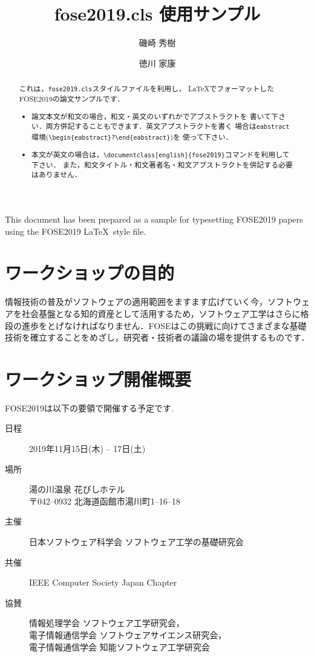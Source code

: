 \documentclass{fose2019}           %
\title{fose2019.cls 使用サンプル}
\author{磯崎 秀樹}{Hideki Isozaki, NTT基礎研究所}
\author{徳川 家康}{Ieyasu Tokugawa, 江戸幕府}
\begin{document}
\maketitle


\begin{abstract}
これは，{\tt fose2019.cls}スタイルファイルを利用し，
\LaTeX でフォーマットしたFOSE2019の論文サンプルです．
\begin{itemize}
\item 論文本文が和文の場合，和文・英文のいずれかでアブストラクトを
書いて下さい．両方併記することもできます．英文アブストラクトを書く
場合は{\tt eabstract}環境(\verb|\begin{eabstract}?\end{eabstract}|)を
使って下さい．
\item 本文が英文の場合は，{\verb|\documentclass[english]{fose2019}|}コマンドを利用して下さい．
また，和文タイトル・和文著者名・和文アブストラクトを併記する必要はありません．
\end{itemize}
\end{abstract}
\begin{eabstract}
This document has been prepared as a sample for typesetting
FOSE2019 papers using the FOSE2019 \LaTeX \ style file.
\end{eabstract}

\section{ワークショップの目的}
情報技術の普及がソフトウェアの適用範囲をますます広げていく今，ソフトウェアを社会基盤となる知的資産として活用するため，ソフトウェア工学はさらに格段の進歩をとげなければなりません．FOSEはこの挑戦に向けてさまざまな基礎技術を確立することをめざし，研究者・技術者の議論の場を提供するものです．

\section{ワークショップ開催概要}
FOSE2019\cite{fose2019}は以下の要領で開催する予定です.
\begin{description}
\item[日程] 2019年11月15日(木) -- 17日(土)
\item[場所] 湯の川温泉 花びしホテル\\
{\footnotesize
   〒042--0932 北海道函館市湯川町1--16--18
}
\item[主催] 日本ソフトウェア科学会 ソフトウェア工学の基礎研究会
\item[共催] IEEE Computer Society Japan Chapter
\item[協賛] 情報処理学会 ソフトウェア工学研究会，\\
	電子情報通信学会 ソフトウェアサイエンス研究会，\\
	電子情報通信学会 知能ソフトウェア工学研究会
\end{description}
\end{document}
